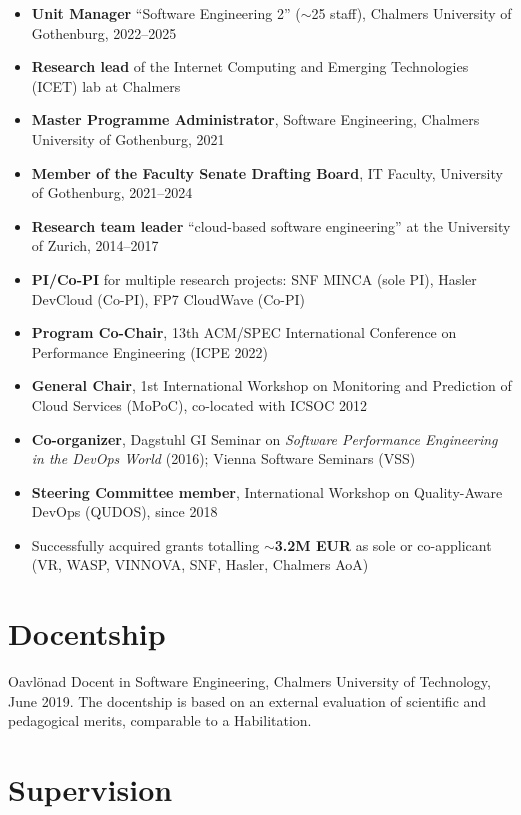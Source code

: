 \documentclass[a4paper,11pt]{article}
\begin{document}
\begin{itemize}
  \item \textbf{Unit Manager} ``Software Engineering 2'' ($\sim$25 staff), Chalmers \textbar{} University of Gothenburg, 2022--2025
  \item \textbf{Research lead} of the Internet Computing and Emerging Technologies (ICET) lab at Chalmers
  \item \textbf{Master Programme Administrator}, Software Engineering, Chalmers \textbar{} University of Gothenburg, 2021
  \item \textbf{Member of the Faculty Senate Drafting Board}, IT Faculty, University of Gothenburg, 2021--2024
  \item \textbf{Research team leader} ``cloud-based software engineering'' at the University of Zurich, 2014--2017
  \item \textbf{PI/Co-PI} for multiple research projects: SNF MINCA (sole PI), Hasler DevCloud (Co-PI), FP7 CloudWave (Co-PI)
  \item \textbf{Program Co-Chair}, 13th ACM/SPEC International Conference on Performance Engineering (ICPE 2022)
  \item \textbf{General Chair}, 1st International Workshop on Monitoring and Prediction of Cloud Services (MoPoC), co-located with ICSOC 2012
  \item \textbf{Co-organizer}, Dagstuhl GI Seminar on \emph{Software Performance Engineering in the DevOps World} (2016); Vienna Software Seminars (VSS)
  \item \textbf{Steering Committee member}, International Workshop on Quality-Aware DevOps (QUDOS), since 2018
  \item Successfully acquired grants totalling \textbf{$\sim$3.2M EUR} as sole or co-applicant (VR, WASP, VINNOVA, SNF, Hasler, Chalmers AoA)
\end{itemize}

\section{Docentship}

\noindent Oavlönad Docent in Software Engineering, Chalmers University of Technology, June 2019. The docentship is based on an external evaluation of scientific and pedagogical merits, comparable to a Habilitation.

\section{Supervision}
\end{document}
